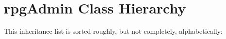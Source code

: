 \section{rpg\-Admin Class Hierarchy}
This inheritance list is sorted roughly, but not completely, alphabetically:\begin{CompactList}
\item {}
\end{CompactList}
